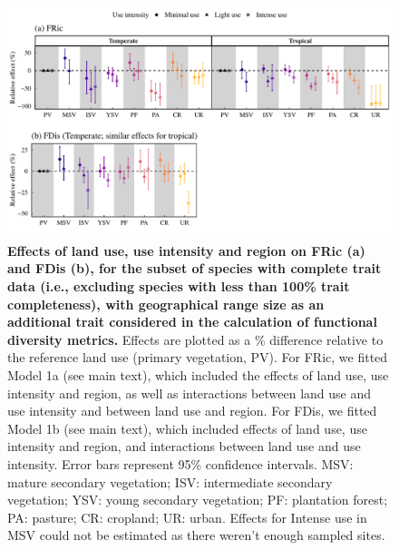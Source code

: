 \begin{figure}[h!]
\centering
\includegraphics[scale=0.7]{Supporting/Chapter3/Figures/SI_Figure19}
\caption[Effects of land use, use intensity and region on FRic (a) and FDis (b), for the subset of species with complete trait data, with geographical range size as an additional trait]{\textbf{Effects of land use, use intensity and region on FRic (a) and FDis (b), for the subset of species with complete trait data (i.e., excluding species with less than 100\% trait completeness), with geographical range size as an additional trait considered in the calculation of functional diversity metrics.} Effects are plotted as a \% difference relative to the reference land use (primary vegetation, PV). For FRic, we fitted Model 1a (see main text), which included the effects of land use, use intensity and region, as well as interactions between land use and use intensity and between land use and region. For FDis, we fitted Model 1b (see main text), which included effects of land use, use intensity and region, and interactions between land use and use intensity. Error bars represent 95\% confidence intervals. MSV: mature secondary vegetation; ISV: intermediate secondary vegetation; YSV: young secondary vegetation; PF: plantation forest; PA: pasture; CR: cropland; UR: urban. Effects for Intense use in MSV could not be estimated as there weren’t enough sampled sites.}
\label{}
\end{figure}


